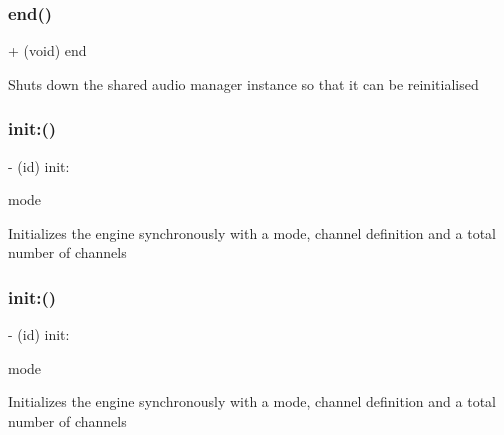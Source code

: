 \subsubsection{\texorpdfstring{end()}{end()}\hspace{0.1cm}{\footnotesize\ttfamily [4/4]}}
{\footnotesize\ttfamily + (void) end \begin{DoxyParamCaption}{ }\end{DoxyParamCaption}}

Shuts down the shared audio manager instance so that it can be reinitialised \mbox{\label{interfaceCDAudioManager_ae2d8ef3daed8297ee37cd14b67687407}} 
\subsubsection{\texorpdfstring{init\+:()}{init:()}\hspace{0.1cm}{\footnotesize\ttfamily [1/4]}}
{\footnotesize\ttfamily -\/ (id) init\+: \begin{DoxyParamCaption}\item[{(t\+Audio\+Manager\+Mode)}]{mode }\end{DoxyParamCaption}}

Initializes the engine synchronously with a mode, channel definition and a total number of channels \mbox{\label{interfaceCDAudioManager_ae2d8ef3daed8297ee37cd14b67687407}} 
\subsubsection{\texorpdfstring{init\+:()}{init:()}\hspace{0.1cm}{\footnotesize\ttfamily [2/4]}}
{\footnotesize\ttfamily -\/ (id) init\+: \begin{DoxyParamCaption}\item[{(t\+Audio\+Manager\+Mode)}]{mode }\end{DoxyParamCaption}}

Initializes the engine synchronously with a mode, channel definition and a total number of channels \mbox{\label{interfaceCDAudioManager_ae2d8ef3daed8297ee37cd14b67687407}} 
